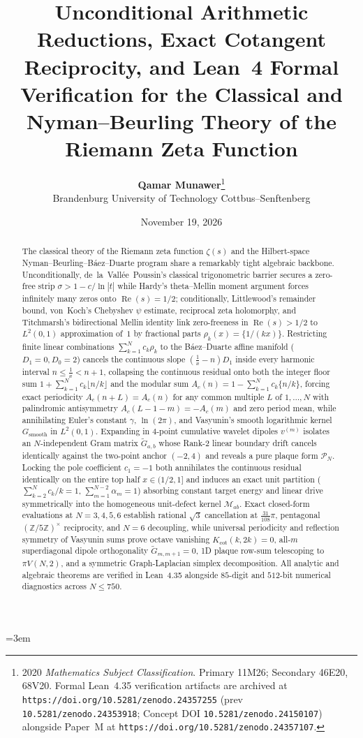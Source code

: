 \documentclass[11pt,a4paper]{article}
\title{\textbf{Unconditional Arithmetic Reductions, Exact Cotangent Reciprocity, and Lean~4 Formal Verification for the Classical and Nyman--Beurling Theory of the Riemann Zeta Function}}
\author{\textbf{Qamar Munawer}\thanks{2020 \emph{Mathematics Subject Classification}. Primary 11M26; Secondary 46E20, 68V20. Formal Lean~4.35 verification artifacts are archived at \texttt{https://doi.org/10.5281/zenodo.24357255} (prev \texttt{10.5281/zenodo.24353918}; Concept DOI \texttt{10.5281/zenodo.24150107}) alongside Paper~M at \texttt{https://doi.org/10.5281/zenodo.24357107}.}\\[0.25em]
\small Brandenburg University of Technology Cottbus--Senftenberg}
\date{November 19, 2026}
\theoremstyle{definition}
\newcommand{\Z}{\mathbb{Z}}
\begin{document}
\linespread{1.12}\selectfont
\emergencystretch=3em

\maketitle

\begin{abstract}
The classical theory of the Riemann zeta function $\zeta(s)$ and the Hilbert-space Nyman--Beurling--B\'aez--Duarte program share a remarkably tight algebraic backbone. Unconditionally, de~la~Vall\'ee~Poussin's classical trigonometric barrier secures a zero-free strip $\sigma > 1 - c/\ln|t|$ while Hardy's theta--Mellin moment argument forces infinitely many zeros onto $\operatorname{Re}(s) = 1/2$; conditionally, Littlewood's remainder bound, von~Koch's Chebyshev $\psi$ estimate, reciprocal zeta holomorphy, and Titchmarsh's bidirectional Mellin identity link zero-freeness in $\operatorname{Re}(s) > 1/2$ to $L^2(0,1)$ approximation of~$1$ by fractional parts $\rho_k(x) = \{1/(kx)\}$. Restricting finite linear combinations $\sum_{k=1}^N c_k \rho_k$ to the B\'aez--Duarte affine manifold ($D_1 = 0, D_0 = 2$) cancels the continuous slope $(\tfrac{1}{x} - n) D_1$ inside every harmonic interval $n \le \tfrac{1}{x} < n+1$, collapsing the continuous residual onto both the integer floor sum $1 + \sum_{k=1}^N c_k \lfloor n/k \rfloor$ and the modular sum $A_c(n) = 1 - \sum_{k=1}^N c_k \{n/k\}$, forcing exact periodicity $A_c(n+L)=A_c(n)$ for any common multiple $L$ of $1,\dots,N$ with palindromic antisymmetry $A_c(L - 1 - m) = -A_c(m)$ and zero period mean, while annihilating Euler's constant $\gamma$, $\ln(2\pi)$, and Vasyunin's smooth logarithmic kernel $G_{\mathrm{smooth}}$ in $L^2(0,1)$. Expanding in $4$-point cumulative wavelet dipoles $v^{(m)}$ isolates an $N$-independent Gram matrix $\widetilde{G}_{a,b}$ whose Rank-$2$ linear boundary drift cancels identically against the two-point anchor $(-2, 4)$ and reveals a pure plaque form $\mathcal{P}_N$. Locking the pole coefficient $c_1 = -1$ both annihilates the continuous residual identically on the entire top half $x \in (1/2, 1]$ and induces an exact unit partition ($\sum_{k=2}^N c_k/k = 1$, $\sum_{m=1}^{N-2}\alpha_m = 1$) absorbing constant target energy and linear drive symmetrically into the homogeneous unit-defect kernel $\mathcal{M}_{ab}$. Exact closed-form evaluations at $N = 3, 4, 5, 6$ establish rational $\sqrt{3}$ cancellation at $\tfrac{31}{108}\pi$, pentagonal $(\Z/5\Z)^\times$ reciprocity, and $N=6$ decoupling, while universal periodicity and reflection symmetry of Vasyunin sums prove octave vanishing $K_{\mathrm{cot}}(k,2k) = 0$, all-$m$ superdiagonal dipole orthogonality $\widetilde{G}_{m,m+1} = 0$, 1D plaque row-sum telescoping to $\pi V(N,2)$, and a symmetric Graph-Laplacian simplex decomposition. All analytic and algebraic theorems are verified in Lean~4.35 alongside $85$-digit and $512$-bit numerical diagnostics across $N \le 750$.
\end{abstract}
\end{document}
